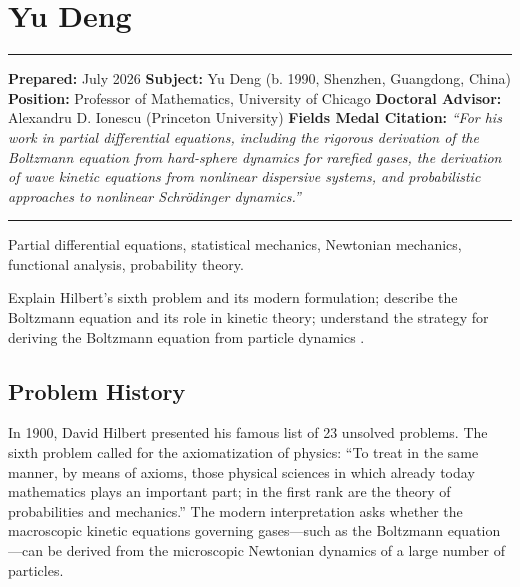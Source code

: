 \chapter{Yu Deng}\label{ch2026yudeng:yu-deng-fields-medal-2026}

\begin{center}\rule{0.5\linewidth}{0.5pt}\end{center}

\textbf{Prepared:} July 2026 \textbf{Subject:} Yu Deng (b. 1990, Shenzhen, Guangdong, China) \textbf{Position:} Professor of Mathematics, University of Chicago \textbf{Doctoral Advisor:} Alexandru D. Ionescu (Princeton University) \textbf{Fields Medal Citation:} \emph{``For his work in partial differential equations, including the rigorous derivation of the Boltzmann equation from hard-sphere dynamics for rarefied gases, the derivation of wave kinetic equations from nonlinear dispersive systems, and probabilistic approaches to nonlinear Schr\"odinger dynamics.''}

\begin{center}\rule{0.5\linewidth}{0.5pt}\end{center}

\begin{prereqs} Partial differential equations, statistical mechanics, Newtonian mechanics, functional analysis, probability theory. \end{prereqs}

\begin{objectives} Explain Hilbert's sixth problem and its modern formulation; describe the Boltzmann equation and its role in kinetic theory; understand the strategy for deriving the Boltzmann equation from particle dynamics \cite{denghanima2024}. \end{objectives}

\section{Problem History}

In 1900, David Hilbert presented his famous list of 23 unsolved problems. The sixth problem called for the axiomatization of physics: ``To treat in the same manner, by means of axioms, those physical sciences in which already today mathematics plays an important part; in the first rank are the theory of probabilities and mechanics.'' The modern interpretation asks whether the macroscopic kinetic equations governing gases---such as the Boltzmann equation---can be derived from the microscopic Newtonian dynamics of a large number of particles.

